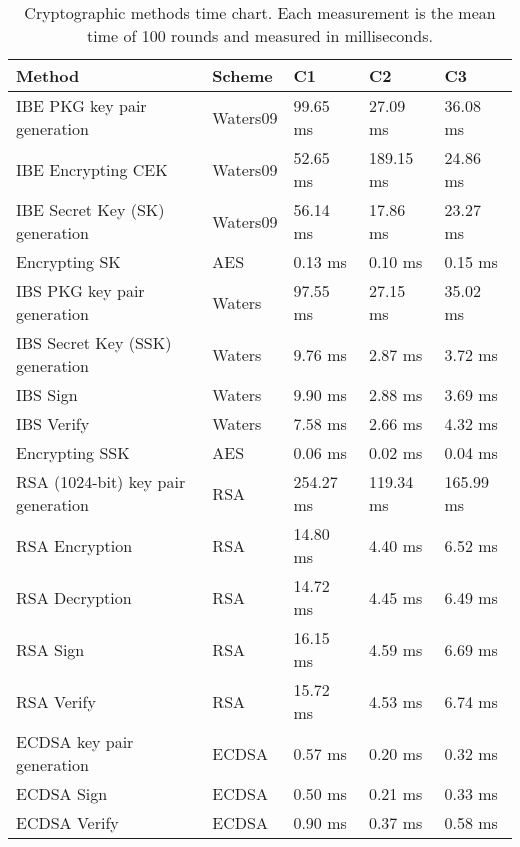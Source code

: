 \begin{table}[h]
  \begin{tabular}[c]{lllll}
  Method                                      & Scheme          & C1              & C2          & C3              \\ \hline
  IBE PKG key pair generation                 & Waters09        & 99.65 ms        & 27.09 ms    & 36.08 ms     \\ %
  IBE Encrypting CEK                          & Waters09        & 52.65 ms        & 189.15 ms   & 24.86 ms     \\ %
  IBE Secret Key (SK) generation              & Waters09        & 56.14 ms        & 17.86 ms    & 23.27 ms     \\ %
  Encrypting SK                               & AES             & 0.13 ms         & 0.10 ms     & 0.15 ms     \\ %
  IBS PKG key pair generation                 & Waters          & 97.55 ms        & 27.15 ms    & 35.02 ms     \\ %
  IBS Secret Key (SSK) generation             & Waters          & 9.76 ms         & 2.87 ms     & 3.72 ms     \\ %
  IBS Sign                                    & Waters          & 9.90 ms         & 2.88 ms     & 3.69 ms     \\ %
  IBS Verify                                  & Waters          & 7.58 ms         & 2.66 ms     & 4.32 ms     \\ %
  Encrypting SSK                              & AES             & 0.06 ms         & 0.02 ms     & 0.04 ms     \\ %
  RSA (1024-bit) key pair generation          & RSA             & 254.27 ms       & 119.34 ms   & 165.99 ms     \\ %
  RSA Encryption                              & RSA             & 14.80 ms        & 4.40 ms     & 6.52 ms     \\ %
  RSA Decryption                              & RSA             & 14.72 ms        & 4.45 ms     & 6.49 ms     \\ %
  RSA Sign                                    & RSA             & 16.15 ms        & 4.59 ms     & 6.69 ms     \\ %
  RSA Verify                                  & RSA             & 15.72 ms        & 4.53 ms     & 6.74 ms     \\ %
  ECDSA key pair generation                   & ECDSA           & 0.57 ms         & 0.20 ms     & 0.32 ms     \\ %
  ECDSA Sign                                  & ECDSA           & 0.50 ms         & 0.21 ms     & 0.33 ms     \\ %
  ECDSA Verify                                & ECDSA           & 0.90 ms         & 0.37 ms     & 0.58 ms     \\ %
  \end{tabular}
  \caption{Cryptographic methods time chart. Each measurement is the mean time of 100 rounds and measured in milliseconds. }
  \label{tbl:time_chart}
\end{table}


